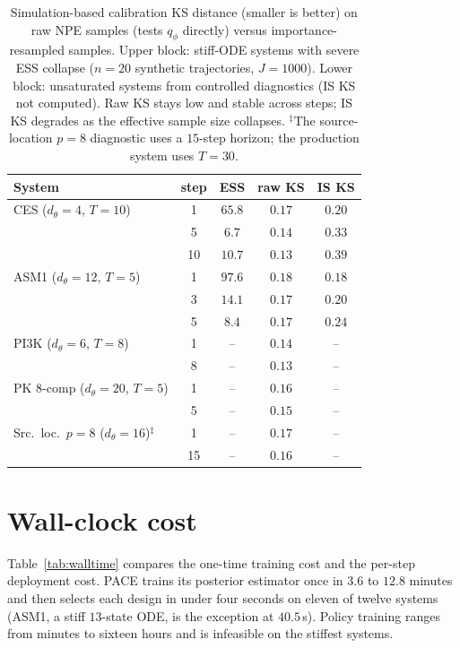 \begin{table}[h]
\centering\small
\caption[Per-step calibration]{Simulation-based calibration KS distance (smaller is
better) on raw NPE samples (tests $q_\phi$ directly) versus importance-resampled
samples. Upper block: stiff-ODE systems with severe ESS collapse ($n{=}20$ synthetic
trajectories, $J{=}1000$). Lower block: unsaturated systems from controlled diagnostics
(IS KS not computed). Raw KS stays low and stable across steps; IS KS degrades as the
effective sample size collapses. $^\ddagger$The source-location $p{=}8$ diagnostic uses
a $15$-step horizon; the production system uses $T{=}30$.}
\label{tab:sbc}
\begin{tabular}{lcccc}
\toprule
System & step & ESS & raw KS & IS KS \\
\midrule
CES ($d_\theta{=}4$, $T{=}10$)
  & 1 & $65.8$ & $0.17$ & $0.20$ \\
  & 5 & $6.7$ & $0.14$ & $0.33$ \\
  & 10 & $10.7$ & $0.13$ & $0.39$ \\
ASM1 ($d_\theta{=}12$, $T{=}5$)
  & 1 & $97.6$ & $0.18$ & $0.18$ \\
  & 3 & $14.1$ & $0.17$ & $0.20$ \\
  & 5 & $8.4$ & $0.17$ & $0.24$ \\
\midrule
PI3K ($d_\theta{=}6$, $T{=}8$)
  & 1 & -- & $0.14$ & -- \\
  & 8 & -- & $0.13$ & -- \\
PK 8-comp ($d_\theta{=}20$, $T{=}5$)
  & 1 & -- & $0.16$ & -- \\
  & 5 & -- & $0.15$ & -- \\
Src.\ loc.\ $p{=}8$ ($d_\theta{=}16$)$^\ddagger$
  & 1 & -- & $0.17$ & -- \\
  & 15 & -- & $0.16$ & -- \\
\bottomrule
\end{tabular}
\end{table}

\chapter{Wall-clock cost}
\label{app:walltime}

Table~\ref{tab:walltime} compares the one-time training cost and the per-step
deployment cost. PACE trains its posterior estimator once in $3.6$ to $12.8$ minutes
and then selects each design in under four seconds on eleven of twelve systems (ASM1,
a stiff $13$-state ODE, is the exception at $40.5$\,s). Policy training ranges from
minutes to sixteen hours and is infeasible on the stiffest systems.

